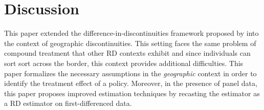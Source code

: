 \documentclass[12pt]{article}
\begin{document}
\section{Discussion}

This paper extended the difference-in-discontinuities framework proposed by \citet{Grembi_Nannicini_Troiano_2016} into the context of geographic discontinuities. This setting faces the same problem of compound treatment that other RD contexts exhibit and since individuals can sort sort across the border, this context provides additional difficulties. This paper formalizes the necessary assumptions in the \emph{geographic} context in order to identify the treatment effect of a policy. Moreover, in the presence of panel data, this paper proposes improved estimation techniques by recasting the estimator as a RD estimator on first-differenced data. 









\setlength{\bibsep}{0.0pt}

\end{document}
